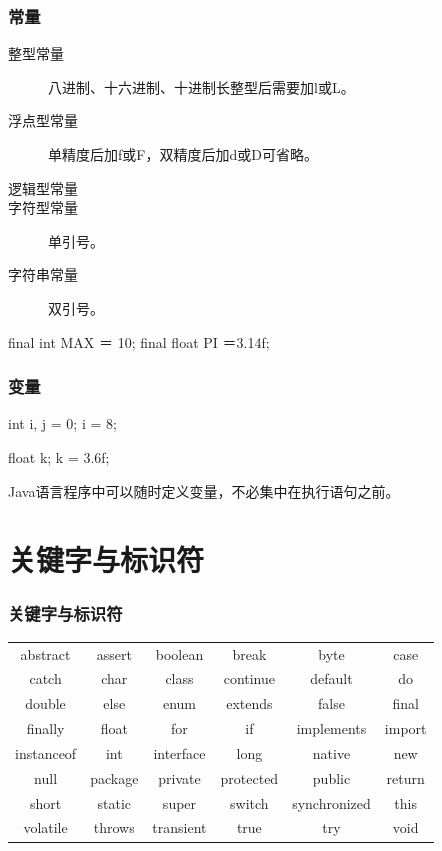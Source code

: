\begin{frame}[fragile]
  \frametitle{常量}

  \begin{description}
  \item[整型常量] 八进制、十六进制、十进制长整型后需要加l或L。
  \item[浮点型常量] 单精度后加f或F，双精度后加d或D可省略。
  \item[逻辑型常量]
  \item[字符型常量] 单引号。
  \item[字符串常量] 双引号。
  \end{description}


  \begin{javaCode}
    final int MAX ＝ 10;
    final float PI ＝3.14f;
  \end{javaCode}
\end{frame}


\begin{frame}[fragile]
  \frametitle{变量}


  \begin{javaCode}
    int i, j = 0;
    i = 8;
    
    float k;
    k = 3.6f;
  \end{javaCode}
  
  Java语言程序中可以随时定义变量，不必集中在执行语句之前。
\end{frame}

\section{关键字与标识符}

\begin{frame}[fragile]
  \frametitle{关键字与标识符}


  \begin{table}
    \footnotesize
    \setlength{\extrarowheight}{1.2mm}
    \begin{tabular}{c|c|c|c|c|c}
      abstract & assert & boolean & break & byte & case \\
      catch & char & class & continue & default & do \\
      double & else & enum & extends & false & final \\
      finally & float & for & if & implements & import \\
      instanceof & int & interface & long & native & new \\
      null & package & private & protected & public & return \\
      short & static & super & switch & synchronized & this \\
      volatile & throws & transient & true & try & void \\
    \end{tabular}
  \end{table}
\end{frame}


